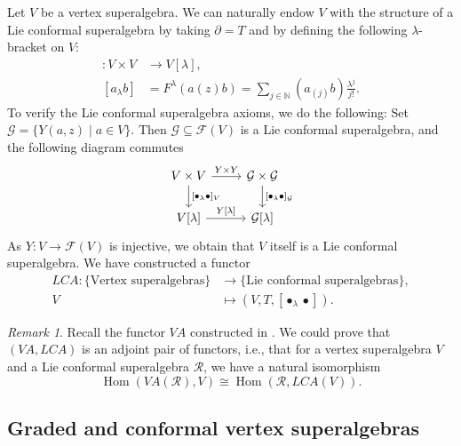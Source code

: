 \documentclass[a4paper, 12pt, reqno]{amsart}
\theoremstyle{remark}
\newtheorem{remark}[theorem]{Remark}
\numberwithin{equation}{subsection}
\DeclareMathOperator{\Hom}{Hom}
\begin{document}
Let $V$ be a vertex superalgebra.
We can naturally endow $V$ with the structure of a Lie conformal superalgebra by taking $\partial = T$ and by defining the following $\lambda$-bracket on $V$:
\begin{align*}
  [\bullet_{\lambda}\bullet]: V \times V &\to V[\lambda], \\
  [a_{\lambda}b] &= F^{\lambda}(a(z)b) = \sum_{j \in \mathbb{N}}(a_{(j)}b)\frac{\lambda^j}{j!}.
\end{align*}
To verify the Lie conformal superalgebra axioms, we do the following:
Set $\mathcal{G} = \{Y(a, z) \mid a \in V\}$.
Then $\mathcal{G} \subseteq \mathcal{F}(V)$ is a Lie conformal superalgebra, and the following diagram commutes
\begin{equation*}
  \begin{tikzcd}
    V \times V \arrow[d, "{[\bullet_{\lambda}\bullet]_V}"] \arrow[r, "Y \times Y"] & \mathcal{G} \times \mathcal{G} \arrow[d, "{[\bullet_{\lambda}\bullet]_{\mathcal{G}}}"] \\
    {V[\lambda]} \arrow[r, "{Y[\lambda]}"] & {\mathcal{G}[\lambda]}
  \end{tikzcd}
\end{equation*}
As $Y: V \to \mathcal{F}(V)$ is injective, we obtain that $V$ itself is a Lie conformal superalgebra.
We have constructed a functor
\begin{align*}
  LCA: \{\text{Vertex superalgebras}\} &\to \{\text{Lie conformal superalgebras}\}, \\
  V &\mapsto (V, T, [\bullet_{\lambda}\bullet]).
\end{align*}

\begin{remark}
  \label{rmk:17}
  Recall the functor $VA$ constructed in .
  We could prove that $(VA, LCA)$ is an adjoint pair of functors, i.e., that for a vertex superalgebra $V$ and a Lie conformal superalgebra $\mathcal{R}$, we have a natural isomorphism
  \begin{equation*}
    \Hom(VA(\mathcal{R}), V) \cong \Hom(\mathcal{R}, LCA(V)).
  \end{equation*}
\end{remark}

\subsection{Graded and conformal vertex superalgebras}
\label{sec:grad-conf-vert}
\end{document}
